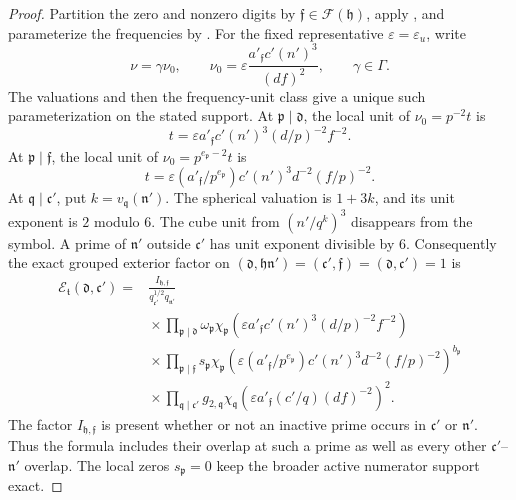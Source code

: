 \begin{proof}
Partition the zero and nonzero digits by
\(\mathfrak f\in\mathcal F(\mathfrak h)\), apply
, and parameterize the frequencies by
.  For the fixed representative
\(\varepsilon=\varepsilon_u\), write
\[
 \nu=\gamma\nu_0,\qquad
 \nu_0=\varepsilon\frac{a'_{\mathfrak f}c'(n')^3}{(df)^2},
 \qquad \gamma\in\Gamma.
\]
The valuations and then the frequency-unit class give a unique such
parameterization on the stated support.  At
\(\mathfrak p\mid\mathfrak d\), the local unit of \(\nu_0=p^{-2}t\) is
\[
 t=\varepsilon a'_{\mathfrak f}c'(n')^3(d/p)^{-2}f^{-2}.
\]
At \(\mathfrak p\mid\mathfrak f\), the local unit of
\(\nu_0=p^{e_{\mathfrak p}-2}t\) is
\[
 t=\varepsilon(a'_{\mathfrak f}/p^{e_{\mathfrak p}})
                  c'(n')^3d^{-2}(f/p)^{-2}.
\]
At \(\mathfrak q\mid\mathfrak c'\), put
\(k=v_{\mathfrak q}(\mathfrak n')\).  The spherical valuation is \(1+3k\),
and its unit exponent is \(2\) modulo \(6\).  The cube unit from
\((n'/q^k)^3\) disappears from the symbol.  A prime of \(\mathfrak n'\)
outside \(\mathfrak c'\) has unit exponent divisible by \(6\).
Consequently the exact grouped exterior factor on
\((\mathfrak d,\mathfrak h\mathfrak n')=
  (\mathfrak c',\mathfrak f)=(\mathfrak d,\mathfrak c')=1\) is
\begin{equation}\label{eq:reflection-exterior-factorization}
\begin{split}
 \mathcal E_{\mathfrak t}(\mathfrak d,\mathfrak c')
 ={}&\frac{I_{\mathfrak h,\mathfrak f}}
          {q_{\mathfrak c'}^{1/2}q_{\mathfrak n'}}\\
 &{}\times\prod_{\mathfrak p\mid\mathfrak d}
       \omega_{\mathfrak p}
       \chi_{\mathfrak p}\!\left(
          \varepsilon a'_{\mathfrak f}c'(n')^3(d/p)^{-2}f^{-2}\right)\\
 &{}\times\prod_{\mathfrak p\mid\mathfrak f}
       s_{\mathfrak p}
       \chi_{\mathfrak p}\!\left(
          \varepsilon(a'_{\mathfrak f}/p^{e_{\mathfrak p}})
          c'(n')^3d^{-2}(f/p)^{-2}\right)^{b_{\mathfrak p}}\\
 &{}\times\prod_{\mathfrak q\mid\mathfrak c'}
       g_{2,\mathfrak q}
       \chi_{\mathfrak q}\!\left(
          \varepsilon a'_{\mathfrak f}(c'/q)(df)^{-2}\right)^2 .
\end{split}
\end{equation}
The factor \(I_{\mathfrak h,\mathfrak f}\) is present whether or not an
inactive prime occurs in \(\mathfrak c'\) or \(\mathfrak n'\).  Thus the
formula includes their overlap at such a prime as well as every other
\(\mathfrak c'\)--\(\mathfrak n'\) overlap.  The local zeros
\(s_{\mathfrak p}=0\) keep the broader active numerator support exact.


\end{proof}
